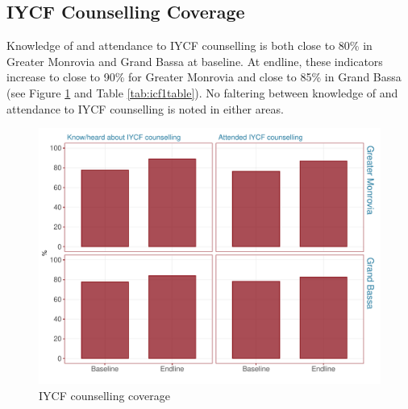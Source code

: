 \documentclass[12pt,a4paper]{article}
\begin{document}
\newpage

\hypertarget{iycf-counselling-coverage}{%
\subsection{IYCF Counselling Coverage}\label{iycf-counselling-coverage}}

Knowledge of and attendance to IYCF counselling is both close to 80\% in Greater Monrovia and Grand Bassa at baseline. At endline, these indicators increase to close to 90\% for Greater Monrovia and close to 85\% in Grand Bassa (see Figure \ref{fig:icf1plot} and Table \ref{tab:icf1table}). No faltering between knowledge of and attendance to IYCF counselling is noted in either areas.

\begin{figure}[H]

{\centering \includegraphics{liberiaCoverageFinalReport_files/figure-latex/icf1plot-1} 

}

\caption{IYCF counselling coverage}\label{fig:icf1plot}
\end{figure}
\end{document}
